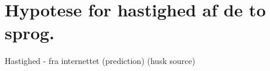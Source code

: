 \documentclass[class=report, crop=false]{standalone}
\begin{document}
    \section{Hypotese for hastighed af de to sprog.}
    Hastighed -\> fra internettet (prediction) (husk source)
\end{document}
